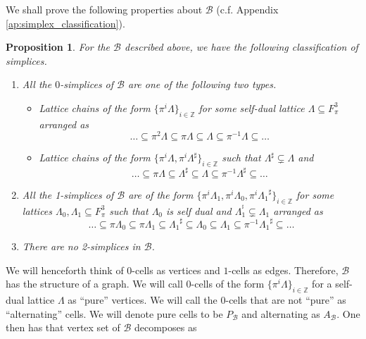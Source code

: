 \documentclass{eptcs}
\newtheorem{proposition}[theorem]{Proposition}
\theoremstyle{remark}
\theoremstyle{definition}
\providecommand{\tightlist}{%
  \setlength{\itemsep}{0pt}\setlength{\parskip}{0pt}}
\newcommand{\dual}[1]{{#1}^{\sharp}}
\begin{document}
We shall prove the following properties about $\mathcal{B}$ (c.f. Appendix \ref{ap:simplex_classification}).
\begin{proposition}
    \label{pr:simplex_classification}
For the $\mathcal{B}$ described above, we have the following classification of simplices.
  \begin{enumerate}
  \tightlist
    \item All the $0$-simplices  of $\mathcal{B}$ are one of the following two types.
      \begin{itemize}
\tightlist
          \item 
Lattice chains of the form $\{ \pi^{i}\Lambda\}_{i \in \mathbb{Z}}$ for some self-dual lattice $\Lambda \subseteq F_{\pi}^{3}$  arranged as 
\begin{equation}
    \dots \subseteq \pi^{2} \Lambda \subseteq \pi \Lambda \subseteq \Lambda \subseteq \pi^{-1} \Lambda \subseteq \dots
\end{equation}
    \item 
	Lattice chains of the form $\{ \pi^i\Lambda, \pi^i \dual{\Lambda}\}_{i \in \mathbb{Z}}$ 
	 such that $\dual{\Lambda} \subsetneq\Lambda$ and
	 \begin{equation}
	       \dots \subseteq \pi \Lambda \subseteq \dual{\Lambda}  \subseteq \Lambda \subseteq \pi^{-1} \dual{\Lambda}  \subseteq \dots
	 \end{equation}
      \end{itemize}
  \item All the 1-simplices of $\mathcal{B}$ are of the form $\{ \pi^i\Lambda_1, \pi^i \Lambda_0, \pi^i \dual{\Lambda_{1}} \}_{i \in \mathbb{Z}}$  for some lattices $\Lambda_0,\Lambda_1\subseteq F_{{\pi}}^3$ 
      such that $\Lambda_0$ is self dual and $\Lambda_1^{\dual{}} \subsetneq \Lambda_1$ arranged as
      \begin{equation}
              \dots \subseteq \pi \Lambda_0 \subseteq \pi\Lambda_{1}  \subseteq \dual{\Lambda_{1}} \subseteq \Lambda_0 \subseteq \Lambda_{1} \subseteq \pi^{-1} \dual{\Lambda_{1}} \subseteq \dots
      \end{equation}
      
      \item There are no 2-simplices in $\mathcal{B}$.
      \end{enumerate}
\end{proposition}

We will henceforth think of $0$-cells as vertices and $1$-cells as edges. Therefore, $\mathcal{B}$ has the structure of a graph.
We will call $0$-cells of the form $\{ \pi^{i}\Lambda\}_{ i \in \mathbb{Z}}$ for a self-dual lattice $\Lambda$ as ``pure'' vertices. We will call the $0$-cells that are not ``pure'' as ``alternating'' cells.
We will denote pure cells to be $P_{\mathcal{B}}$ and alternating as $A_{\mathcal{B}}$. One then has that vertex set of $\mathcal{B}$ decomposes as 
\end{document}

